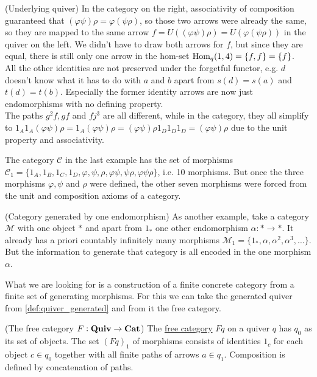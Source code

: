 \begin{example}{(Underlying quiver)}
\noindent In the category on the right, associativity of composition guaranteed that $(\varphi\psi)\rho = \varphi(\psi\rho)$, so those two arrows
were already the same, so they are mapped to the same arrow $f = U((\varphi\psi)\rho) = U(\varphi(\psi\rho))$ in the quiver on the left.
We didn't have to draw both arrows for $f$, but since they are equal, there is still only one arrow in the hom-set $\textup{Hom}_{q}(1,4)=\{f,f\} = \{f\}$.\\
All the other identities are not preserved under the forgetful functor, e.g. $d$ doesn't know what it has to do with $a$ and $b$ apart from
$s(d) = s(a)$ and $t(d) = t(b)$. Especially the former identity arrows are now just endomorphisms with no defining property.\\
The paths $g^{2}f, gf$ and $fj^{3}$ are all different, while in the category, they all simplify to
$1_{A}1_{A}(\varphi\psi)\rho = 1_{A}(\varphi\psi)\rho = (\varphi\psi)\rho1_{D}1_{D}1_{D} =  (\varphi\psi)\rho$ due to the unit property and associativity.
\end{example}

The category $\mathcal{C}$ in the last example has the set of morphisms $\mathcal{C}_{1} =
\{ 1_{A}, 1_{B}, 1_{C}, 1_{D}, \varphi, \psi, \rho, \varphi\psi, \psi\rho, \varphi\psi\rho \}$, i.e. 10 morphisms. But once the three morphisms
$\varphi, \psi$ and $\rho$ were defined, the other seven morphisms were forced from the unit and composition axioms of a category.

\begin{example}{(Category generated by one endomorphism)}\label{ex:category_generated_by_one_endomorphism}
As another example, take a category $\mathcal{M}$ with one object $\ast$ and apart from $1_{\ast}$ one other endomorphism
$\alpha : \ast \rightarrow \ast$. It already has a priori countably infinitely many morphisms
$\mathcal{M}_{1} = \{ 1_{\ast}, \alpha, \alpha^{2}, \alpha^{3}, \dots \}$. But the information to generate that category is all encoded in the
one morphism $\alpha$.
\end{example}

What we are looking for is a construction of a finite concrete category from a finite set of generating morphisms. For this we can take
the generated quiver from \ref{def:quiver_generated} and from it the free category.

\begin{definition}{(The free category $F : \mathrm{\textbf{Quiv}} \rightarrow \mathrm{\textbf{Cat}}$)}\label{ex:free_category}
The \ul{free category} $Fq$ on a quiver $q$ has $q_{0}$ as its set of objects. The set $(Fq)_{1}$ of morphisms consists of identities $1_{c}$ for each
object $c\in q_{0}$ together with all finite paths of arrows $a \in q_{1}$. Composition is defined by concatenation of paths.
\end{definition}

